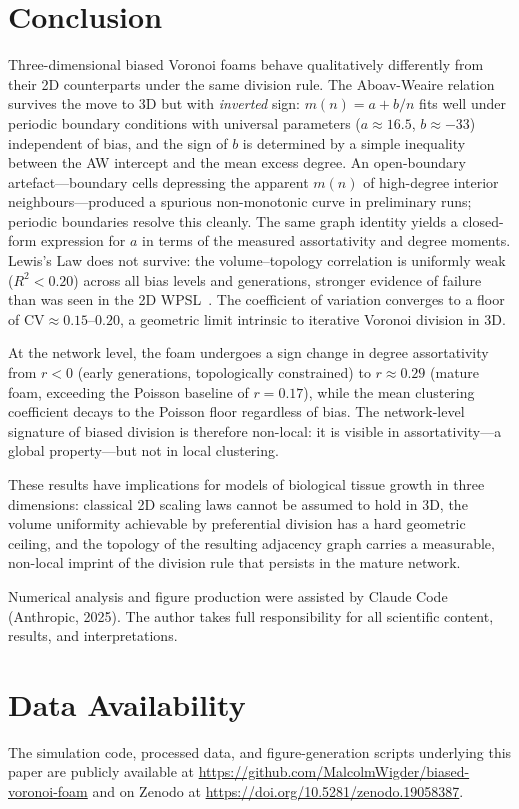 \documentclass[aps,pre,reprint,amsmath,amssymb,floatfix]{revtex4-2}
\begin{document}
\section{Conclusion}

Three-dimensional biased Voronoi foams behave qualitatively differently from
their 2D counterparts under the same division rule.
The Aboav-Weaire relation survives the move to 3D but with \emph{inverted}
sign: $m(n)=a+b/n$ fits well under periodic boundary conditions with
universal parameters ($a\approx16.5$, $b\approx-33$) independent of bias,
and the sign of $b$ is determined by a simple inequality between the AW
intercept and the mean excess degree.
An open-boundary artefact---boundary cells depressing the apparent $m(n)$
of high-degree interior neighbours---produced a spurious non-monotonic
curve in preliminary runs; periodic boundaries resolve this cleanly.
The same graph identity yields a closed-form expression for $a$ in terms
of the measured assortativity and degree moments.
Lewis's Law does not survive: the volume--topology correlation is uniformly
weak ($R^2<0.20$) across all bias levels and generations, stronger evidence
of failure than was seen in the 2D WPSL~\cite{islam2014}.
The coefficient of variation converges to a floor of
$\mathrm{CV}\approx0.15$--$0.20$, a geometric limit intrinsic to iterative
Voronoi division in 3D.

At the network level, the foam undergoes a sign change in degree assortativity
from $r<0$ (early generations, topologically constrained) to
$r\approx0.29$ (mature foam, exceeding the Poisson baseline of $r=0.17$),
while the mean clustering coefficient decays to the Poisson floor regardless
of bias.
The network-level signature of biased division is therefore non-local:
it is visible in assortativity---a global property---but not in local
clustering.

These results have implications for models of biological tissue growth in
three dimensions: classical 2D scaling laws cannot be assumed to hold in 3D,
the volume uniformity achievable by preferential division has a hard geometric
ceiling, and the topology of the resulting adjacency graph carries a
measurable, non-local imprint of the division rule that persists in the mature
network.

\begin{acknowledgments}
Numerical analysis and figure production were assisted by Claude Code
(Anthropic, 2025).
The author takes full responsibility for all scientific content, results,
and interpretations.
\end{acknowledgments}

\section*{Data Availability}

The simulation code, processed data, and figure-generation scripts
underlying this paper are publicly available at
\url{https://github.com/MalcolmWigder/biased-voronoi-foam} and on Zenodo at \url{https://doi.org/10.5281/zenodo.19058387}.


\end{document}
